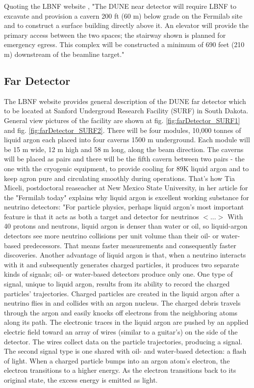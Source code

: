 Quoting the LBNF website \cite{ref_LBNFweb}, "The DUNE near detector will require LBNF to excavate and provision a cavern 200 ft (60 m) below grade on the Fermilab site and to construct a surface building directly above it. An elevator will provide the primary access between the two spaces; the stairway shown is planned for emergency egress. This complex will be constructed a minimum of 690 feet (210 m) downstream of the beamline target."

\subsection{Far Detector}

The LBNF website \cite{ref_LBNFweb} provides general description of the DUNE far detector which to be located at Sanford Undergroud Research Facility (SURF) in South Dakota. General view pictures of the facility are shown at fig. \ref{fig:farDetector_SURF1} and fig. \ref{fig:farDetector_SURF2}. There will be four modules, 10,000 tonnes of liquid argon each placed into four caverns 1500 m underground. Each module will be 15 m wide, 12 m high and 58 m long, along the beam direction. The caverns will be placed as pairs and there will be the fifth cavern between two pairs - the one with the cryogenic equipment, to provide cooling for 89K liquid argon and to keep agron pure and circulating smoothly during operations. 
That's how Tia Miceli, postdoctoral reaseacher at New Mexico State University, in her article for the "Fermilab today" \cite{ref_aboutLAr} explains why liquid argon is excellent working substance for neutrino detectors:
"For particle physics, perhaps liquid argon's most important feature is that it acts as both a target and detector for neutrinos $<...>$ With 40 protons and neutrons, liquid argon is denser than water or oil, so liquid-argon detectors see more neutrino collisions per unit volume than their oil- or water-based predecessors. That means faster measurements and consequently faster discoveries. Another advantage of liquid argon is that, when a neutrino interacts with it and subsequently generates charged particles, it produces two separate kinds of signals; oil- or water-based detectors produce only one. One type of signal, unique to liquid argon, results from its ability to record the charged particles' trajectories. Charged particles are created in the liquid argon after a neutrino flies in and collides with an argon nucleus. The charged debris travels through the argon and easily knocks off electrons from the neighboring atoms along its path. The electronic traces in the liquid argon are pushed by an applied electric field toward an array of wires (similar to a guitar's) on the side of the detector. The wires collect data on the particle trajectories, producing a signal. The second signal type is one shared with oil- and water-based detection: a flash of light. When a charged particle bumps into an argon atom's electron, the electron transitions to a higher energy. As the electron transitions back to its original state, the excess energy is emitted as light. 
